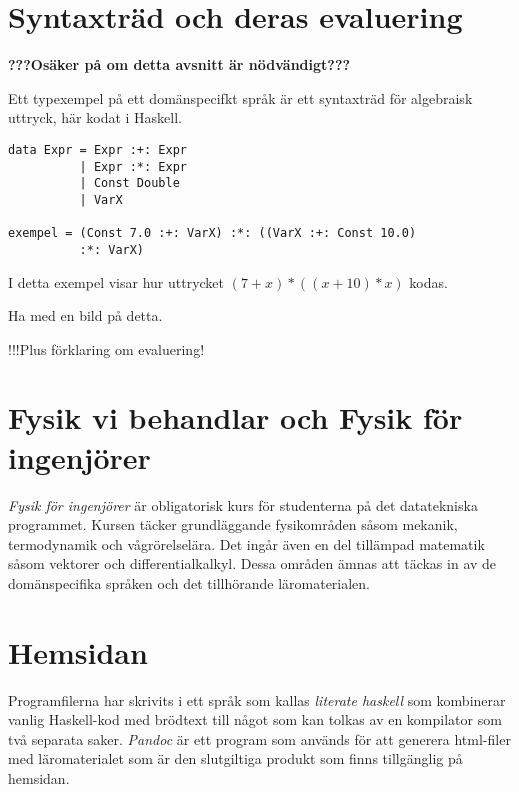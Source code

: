 \section{Syntaxträd och deras evaluering}

\textbf{???Osäker på om detta avsnitt är nödvändigt???}



Ett typexempel på ett domänspecifkt språk är ett syntaxträd för algebraisk uttryck, här kodat i Haskell.

\begin{lstlisting}
data Expr = Expr :+: Expr
          | Expr :*: Expr
          | Const Double
          | VarX

exempel = (Const 7.0 :+: VarX) :*: ((VarX :+: Const 10.0)
          :*: VarX)
\end{lstlisting}

I detta exempel visar hur uttrycket $(7+x)*((x+10)*x)$ kodas.

Ha med en bild på detta.

!!!Plus förklaring om evaluering!


\section{Fysik vi behandlar och Fysik för ingenjörer}

\begin{draft}
  \emph{Fysik för ingenjörer} är obligatorisk kurs för studenterna på det
  datatekniska programmet. Kursen täcker grundläggande fysikområden såsom
  mekanik, termodynamik och vågrörelselära. Det ingår även en del tillämpad
  matematik såsom vektorer och differentialkalkyl. Dessa områden ämnas att
  täckas in av de domänspecifika språken och det tillhörande läromaterialen.
\end{draft}

\section{Hemsidan}

\begin{draft}
  Programfilerna har skrivits i ett språk som kallas \textit{literate haskell}
  som kombinerar vanlig Haskell-kod med brödtext till något som kan tolkas av en
  kompilator som två separata saker. \textit{Pandoc} är ett program som används
  för att generera html-filer med läromaterialet som är den slutgiltiga produkt
  som finns tillgänglig på hemsidan.
\end{draft}
